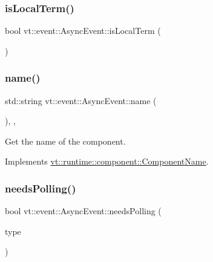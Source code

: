\subsubsection{\texorpdfstring{is\+Local\+Term()}{isLocalTerm()}}
{\footnotesize\ttfamily bool vt\+::event\+::\+Async\+Event\+::is\+Local\+Term (\begin{DoxyParamCaption}{ }\end{DoxyParamCaption})}

\mbox{\label{structvt_1_1event_1_1_async_event_ac68b97804ca9b3dab1785a3c8a5d8242}} 
\subsubsection{\texorpdfstring{name()}{name()}}
{\footnotesize\ttfamily std\+::string vt\+::event\+::\+Async\+Event\+::name (\begin{DoxyParamCaption}{ }\end{DoxyParamCaption})\hspace{0.3cm}{\ttfamily [inline]}, {\ttfamily [override]}, {\ttfamily [virtual]}}



Get the name of the component. 



Implements \hyperlink{structvt_1_1runtime_1_1component_1_1_component_name_a33c06229bb605a2b2ceff68830d6d773}{vt\+::runtime\+::component\+::\+Component\+Name}.

\mbox{\label{structvt_1_1event_1_1_async_event_a4d6056e47909a858fcd3bfc3782b8d2d}} 
\subsubsection{\texorpdfstring{needs\+Polling()}{needsPolling()}}
{\footnotesize\ttfamily bool vt\+::event\+::\+Async\+Event\+::needs\+Polling (\begin{DoxyParamCaption}\item[{\hyperlink{namespacevt_1_1event_a1ea9fec44d101bf40b8fd786d44ebed9}{Event\+Record\+Type\+Type} const \&}]{type }\end{DoxyParamCaption})}

